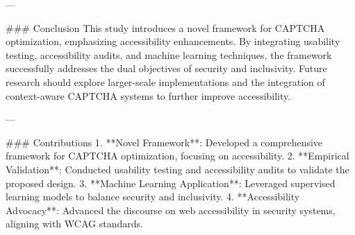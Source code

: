 ---

### Conclusion  
This study introduces a novel framework for CAPTCHA optimization, emphasizing accessibility enhancements. By integrating usability testing, accessibility audits, and machine learning techniques, the framework successfully addresses the dual objectives of security and inclusivity. Future research should explore larger-scale implementations and the integration of context-aware CAPTCHA systems to further improve accessibility.

---

### Contributions  
1. **Novel Framework**: Developed a comprehensive framework for CAPTCHA optimization, focusing on accessibility.  
2. **Empirical Validation**: Conducted usability testing and accessibility audits to validate the proposed design.  
3. **Machine Learning Application**: Leveraged supervised learning models to balance security and inclusivity.  
4. **Accessibility Advocacy**: Advanced the discourse on web accessibility in security systems, aligning with WCAG standards.
